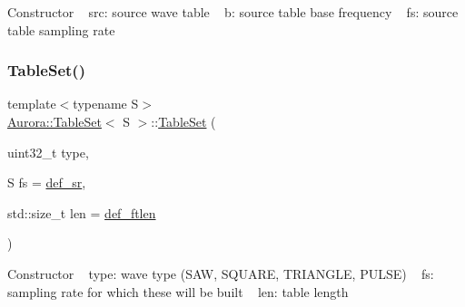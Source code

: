 Constructor ~\newline
src\+: source wave table ~\newline
b\+: source table base frequency ~\newline
fs\+: source table sampling rate \mbox{\label{class_aurora_1_1_table_set_a0be4528b972606335d73ac312da6337b}} 
\subsubsection{\texorpdfstring{Table\+Set()}{TableSet()}\hspace{0.1cm}{\footnotesize\ttfamily [3/4]}}
{\footnotesize\ttfamily template$<$typename S$>$ \\
\hyperlink{class_aurora_1_1_table_set}{Aurora\+::\+Table\+Set}$<$ S $>$\+::\hyperlink{class_aurora_1_1_table_set}{Table\+Set} (\begin{DoxyParamCaption}\item[{uint32\+\_\+t}]{type,  }\item[{S}]{fs = {\ttfamily \hyperlink{namespace_aurora_ad49263d809bea98dd422e95bc91bc03e}{def\+\_\+sr}},  }\item[{std\+::size\+\_\+t}]{len = {\ttfamily \hyperlink{namespace_aurora_a14dabfd9feedfa09c0e6f86d2627f006}{def\+\_\+ftlen}} }\end{DoxyParamCaption})\hspace{0.3cm}{\ttfamily [inline]}}

Constructor ~\newline
type\+: wave type (S\+AW, S\+Q\+U\+A\+RE, T\+R\+I\+A\+N\+G\+LE, P\+U\+L\+SE) ~\newline
fs\+: sampling rate for which these will be built ~\newline
len\+: table length \mbox{\label{class_aurora_1_1_table_set_a884ecfde480fdac4c32fa10a82286941}} 

